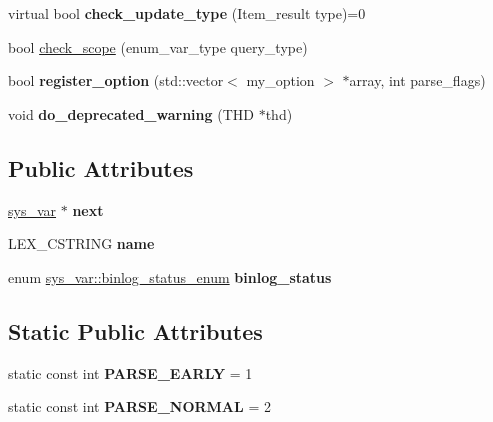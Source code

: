 \begin{DoxyCompactItemize}
virtual bool {\bfseries check\+\_\+update\+\_\+type} (Item\+\_\+result type)=0
\item 
bool \mbox{\hyperlink{classsys__var_a7d4ec87017ce1f1c0ad0441b78c9fe13}{check\+\_\+scope}} (enum\+\_\+var\+\_\+type query\+\_\+type)
\item 
\mbox{\label{classsys__var_a3fd7701411c72b19a30b3c2c4eb5633e}} 
bool {\bfseries register\+\_\+option} (std\+::vector$<$ my\+\_\+option $>$ $\ast$array, int parse\+\_\+flags)
\item 
\mbox{\label{classsys__var_aaf28fd5e1b2ef212b6788553303746d7}} 
void {\bfseries do\+\_\+deprecated\+\_\+warning} (T\+HD $\ast$thd)
\end{DoxyCompactItemize}
\subsection*{Public Attributes}
\begin{DoxyCompactItemize}
\item 
\mbox{\label{classsys__var_a1fddee7f8059b5c479d5f30b96b8692e}} 
\mbox{\hyperlink{classsys__var}{sys\+\_\+var}} $\ast$ {\bfseries next}
\item 
\mbox{\label{classsys__var_a147dbbbcb2b345f2f222e42c1db02928}} 
L\+E\+X\+\_\+\+C\+S\+T\+R\+I\+NG {\bfseries name}
\item 
\mbox{\label{classsys__var_a3116d714c48228cf4cc4ce23fe5249fd}} 
enum \mbox{\hyperlink{classsys__var_a664520ec82191888717c86085bfa83ce}{sys\+\_\+var\+::binlog\+\_\+status\+\_\+enum}} {\bfseries binlog\+\_\+status}
\end{DoxyCompactItemize}
\subsection*{Static Public Attributes}
\begin{DoxyCompactItemize}
\item 
\mbox{\label{classsys__var_a07bb244cb6cde29dfc1bb273bc47090c}} 
static const int {\bfseries P\+A\+R\+S\+E\+\_\+\+E\+A\+R\+LY} = 1
\item 
\mbox{\label{classsys__var_ac0f4bccee567eef3005e5fa04c9b321a}} 
static const int {\bfseries P\+A\+R\+S\+E\+\_\+\+N\+O\+R\+M\+AL} = 2
\end{DoxyCompactItemize}
